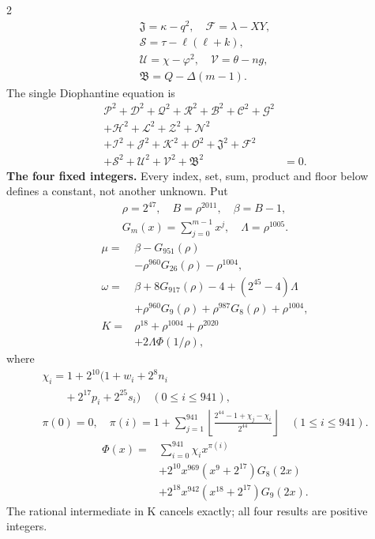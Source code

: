 \documentclass[10pt]{article}
\newcommand{\fl}[1]{\left\lfloor#1\right\rfloor}
\begin{document}
\begin{multicols}{2}
\[\begin{gathered}
\mathfrak{J}=\kappa-q^2,\quad\mathcal{F}=\lambda-XY,\\
\mathcal{S}=\tau-\ell(\ell+k),\\
\mathcal{U}=\chi-\varphi^2,\quad\mathcal{V}=\theta-ng,\\
\mathfrak{B}=Q-\Delta(m-1).
\end{gathered}
\]
The single Diophantine equation is
\[
\begin{split}
\mathcal{P}^2+\mathcal{D}^2+\mathcal{Q}^2+\mathcal{R}^2+\mathcal{B}^2+\mathcal{C}^2+\mathcal{G}^2 &\\
+\mathcal{H}^2+\mathcal{L}^2+\mathcal{Z}^2+\mathcal{N}^2 &\\
+\mathcal{I}^2+\mathcal{J}^2+\mathcal{K}^2+\mathcal{O}^2+\mathfrak{J}^2+\mathcal{F}^2 &\\
+\mathcal{S}^2+\mathcal{U}^2+\mathcal{V}^2+\mathfrak{B}^2 &= 0.
\end{split}
\]
\textbf{The four fixed integers.}
Every index, set, sum, product and floor below defines a constant, not
another unknown. Put
\[
\begin{gathered}
\rho=2^{47},\quad B=\rho^{2011},\quad\beta=B-1,\\
G_m(x)=\sum_{j=0}^{m-1}x^j,\quad
\Lambda=\rho^{1005}.
\end{gathered}
\]
\begin{align*}
\mu={}&\beta-G_{951}(\rho)\\
&-\rho^{960}G_{26}(\rho)-\rho^{1004},\\
\omega={}&\beta+8G_{917}(\rho)-4+(2^{45}-4)\Lambda\\
&+\rho^{960}G_9(\rho)+\rho^{987}G_8(\rho)
  +\rho^{1004},\\
K={}&\rho^{18}+\rho^{1004}+\rho^{2020}\\
&+2\Lambda\Phi(1/\rho),
\end{align*}
where
\[
\begin{gathered}
\chi_i=1+2^{10}(1+w_i+2^8n_i\\
\qquad+2^{17}p_i+2^{25}s_i)\quad(0\le i\le941),\\
\pi(0)=0,\quad\pi(i)=1+\sum_{j=1}^{941}
\fl{\frac{2^{44}-1+\chi_j-\chi_i}{2^{44}}}\quad(1\le i\le941).
\end{gathered}
\]
\[
\begin{split}
\Phi(x)={}&\sum_{i=0}^{941}\chi_i x^{\pi(i)}\\
&+2^{10}x^{969}(x^9+2^{17})G_8(2x)\\
&+2^{18}x^{942}(x^{18}+2^{17})G_9(2x).
\end{split}
\]
The rational intermediate in K cancels exactly; all four results are positive integers.


\end{multicols}
\end{document}
